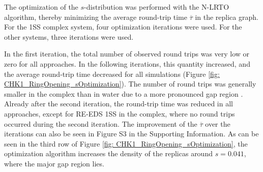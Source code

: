 \begin{table}[h]
\caption{Energy offsets $\vec{E^R}$ estimated from a short RE-EDS simulation using the PEOE \cite{Sidler2016} scheme. The errors indicate the standard deviation over the different replicas in undersampling. All energy offsets were calculated relative to ligand L1. The starting coordinates were selected following the 1SS or the SSM approach (see Theory and Methods sections).}
\label{tab:CHK1_set2_Eoff}
\end{table}

The optimization of the $s$-distribution was performed with the N-LRTO \cite{Sidler2017} algorithm, thereby minimizing the average round-trip time $\overline{\tau}$ in the replica graph. For the 1SS complex system, four optimization iterations were used. For the other systems, three iterations were used. 

%
In the first iteration, the total number of observed round trips was very low or zero for all approaches. In the following iterations, this quantity increased, and the average round-trip time decreased for all simulations (Figure \ref{fig: CHK1_RingOpening_sOptimization}). The number of round trips was generally smaller in the complex than in water due to a more pronounced gap region \cite{Sidler2017}.
Already after the second iteration, the round-trip time was reduced in all approaches, except for 
RE-EDS 1SS in the complex, where no round trips occurred during the second iteration. The improvement of the $\overline{\tau}$ over the iterations can also be seen in Figure S3 in the Supporting Information. %
As can be seen in the third row of Figure \ref{fig: CHK1_RingOpening_sOptimization}, the optimization algorithm increases the density of the replicas around $s = 0.041$, where the major gap region lies.

